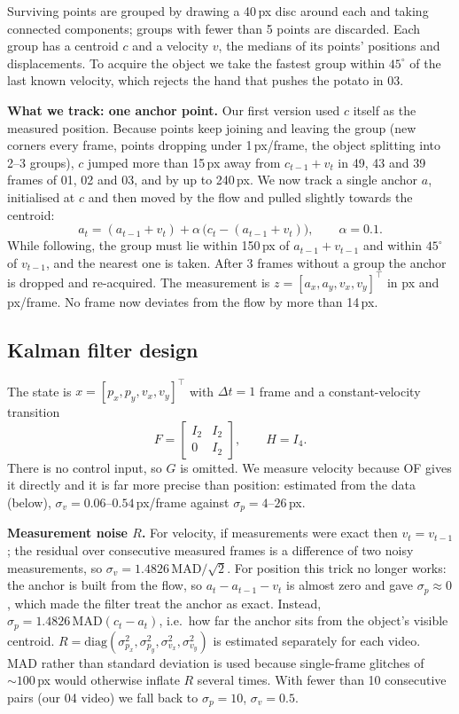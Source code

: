\documentclass[conference]{assets/latex/IEEEtran}
\begin{document}
Surviving points are grouped by drawing a 40\,px disc around each and taking connected components; groups with fewer than 5 points are discarded. Each group has a centroid $c$ and a velocity $v$, the medians of its points' positions and displacements. To acquire the object we take the fastest group within $45^\circ$ of the last known velocity, which rejects the hand that pushes the potato in 03.

\textbf{What we track: one anchor point.} Our first version used $c$ itself as the measured position. Because points keep joining and leaving the group (new corners every frame, points dropping under 1\,px/frame, the object splitting into 2--3 groups), $c$ jumped more than 15\,px away from $c_{t-1}+v_t$ in 49, 43 and 39 frames of 01, 02 and 03, and by up to 240\,px. We now track a single anchor $a$, initialised at $c$ and then moved by the flow and pulled slightly towards the centroid:
\begin{equation}
a_t = (a_{t-1}+v_t) + \alpha\,\bigl(c_t-(a_{t-1}+v_t)\bigr),\qquad \alpha=0.1 .
\end{equation}
While following, the group must lie within 150\,px of $a_{t-1}+v_{t-1}$ and within $45^\circ$ of $v_{t-1}$, and the nearest one is taken. After 3 frames without a group the anchor is dropped and re-acquired. The measurement is $z=[a_x,a_y,v_x,v_y]^\top$ in px and px/frame. No frame now deviates from the flow by more than 14\,px.

\subsection{Kalman filter design}
The state is $x=[p_x,p_y,v_x,v_y]^\top$ with $\Delta t=1$ frame and a constant-velocity transition
\begin{equation}
F=\begin{bmatrix} I_2 & I_2\\ 0 & I_2\end{bmatrix},\qquad H=I_4 .
\end{equation}
There is no control input, so $G$ is omitted. We measure velocity because OF gives it directly and it is far more precise than position: estimated from the data (below), $\sigma_v=0.06$--$0.54$\,px/frame against $\sigma_p=4$--$26$\,px.

\textbf{Measurement noise $R$.} For velocity, if measurements were exact then $v_t=v_{t-1}$; the residual over consecutive measured frames is a difference of two noisy measurements, so $\sigma_v=1.4826\,\mathrm{MAD}/\sqrt2$. For position this trick no longer works: the anchor is built from the flow, so $a_t-a_{t-1}-v_t$ is almost zero and gave $\sigma_p\approx0$, which made the filter treat the anchor as exact. Instead, $\sigma_p=1.4826\,\mathrm{MAD}(c_t-a_t)$, i.e.\ how far the anchor sits from the object's visible centroid. $R=\mathrm{diag}(\sigma_{p_x}^2,\sigma_{p_y}^2,\sigma_{v_x}^2,\sigma_{v_y}^2)$ is estimated separately for each video. MAD rather than standard deviation is used because single-frame glitches of ${\sim}100$\,px would otherwise inflate $R$ several times. With fewer than 10 consecutive pairs (our 04 video) we fall back to $\sigma_p=10$, $\sigma_v=0.5$.
\end{document}
